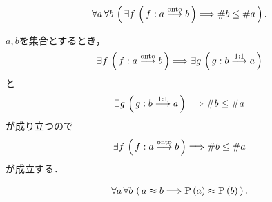	\begin{screen}
		\begin{thm}[全射が存在すれば濃度は大きい]
		\label{thm:if_exists_a_surjection_then_cardinal_of_target_is_bigger}
			\begin{align}
				\forall a\, \forall b\, \left(\, \exists f\, \left(\, f:a \overset{\mathrm{onto}}{\longrightarrow}  b\, \right)
				\Longrightarrow \# b \leq \# a\, \right).
			\end{align}
		\end{thm}
	\end{screen}
	
	\begin{prf}
		$a,b$を集合とするとき，
		\begin{align}
			\exists f\, \left(\, f:a \overset{\mathrm{onto}}{\longrightarrow} b\, \right)
			\Longrightarrow \exists g\, \left(\, g:b \overset{\mathrm{1:1}}{\longrightarrow}  a\, \right)
		\end{align}
		と
		\begin{align}
			\exists g\, \left(\, g:b \overset{\mathrm{1:1}}{\longrightarrow} a\, \right) \Longrightarrow \# b \leq \# a
		\end{align}
		が成り立つので
		\begin{align}
			\exists f\, \left(\, f:a \overset{\mathrm{onto}}{\longrightarrow} b\, \right) \Longrightarrow \# b \leq \# a
		\end{align}
		が成立する．
		\QED
	\end{prf}
	
	\begin{screen}
		\begin{thm}[対等な集合同士は冪も対等]
			\begin{align}
				\forall a\, \forall b\, \left(\, a \approx b \Longrightarrow \operatorname*{P} \left(a\right) \approx \operatorname*{P} \left(b\right)\, \right).
			\end{align}
		\end{thm}
	\end{screen}
	
